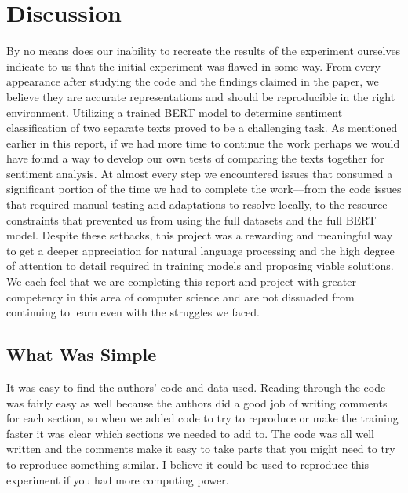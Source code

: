 \documentclass[conference]{IEEEtran}
\begin{document}
\section{Discussion}
	By no means does our inability to recreate the results of the experiment ourselves indicate to us that the initial experiment was flawed in some way. From every appearance after studying the code and the findings claimed in the paper, we believe they are accurate representations and should be reproducible in the right environment.
	Utilizing a trained BERT model to determine sentiment classification of two separate texts proved to be a challenging task. As mentioned earlier in this report, if we had more time to continue the work perhaps we would have found a way to develop our own tests of comparing the texts together for sentiment analysis. At almost every step we encountered issues that consumed a significant portion of the time we had to complete the work–--from the code issues that required manual testing and adaptations to resolve locally, to the resource constraints that prevented us from using the full datasets and the full BERT model.
	Despite these setbacks, this project was a rewarding and meaningful way to get a deeper appreciation for natural language processing and the high degree of attention to detail required in training models and proposing viable solutions. We each feel that we are completing this report and project with greater competency in this area of computer science and are not dissuaded from continuing to learn even with the struggles we faced.

\subsection{What Was Simple}
	It was easy to find the authors’ code and data used.  Reading through the code was fairly easy as well because the authors did a good job of writing comments for each section, so when we added code to try to reproduce or make the training faster it was clear which sections we needed to add to.
	The code was all well written and the comments make it easy to take parts that you might need to try to reproduce something similar.  I believe it could be used to reproduce this experiment if you had more computing power.  
\end{document}
